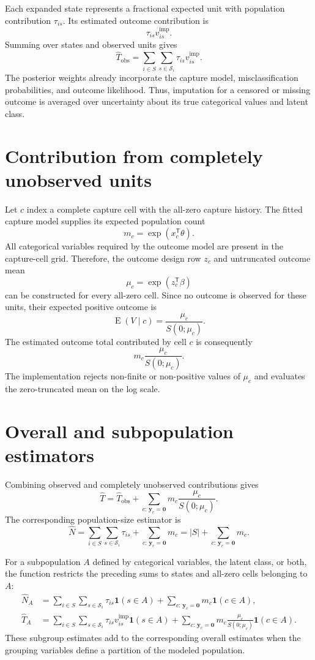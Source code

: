 \documentclass[11pt,a4paper]{article}
\begin{document}
Each expanded state represents a fractional expected unit with population
contribution $\tau_{is}$. Its estimated outcome contribution is
\[
  \tau_{is}v_{is}^{\mathrm{imp}}.
\]
Summing over states and observed units gives
\[
  \widehat T_{\mathrm{obs}}
  =\sum_{i\in S}\sum_{s\in\mathcal S_i}
    \tau_{is}v_{is}^{\mathrm{imp}}.
\]
The posterior weights already incorporate the capture model,
misclassification probabilities, and outcome likelihood. Thus, imputation for
a censored or missing outcome is averaged over uncertainty about its true
categorical values and latent class.

\section{Contribution from completely unobserved units}

Let $c$ index a complete capture cell with the all-zero capture history. The
fitted capture model supplies its expected population count
\[
  m_c=\exp(x_c^{\mathsf T}\theta).
\]
All categorical variables required by the outcome model are present in the
capture-cell grid. Therefore, the outcome design row $z_c$ and untruncated
outcome mean
\[
  \mu_c=\exp(z_c^{\mathsf T}\beta)
\]
can be constructed for every all-zero cell. Since no outcome is observed for
these units, their expected positive outcome is
\[
  \operatorname{E}(V\mid c)
  =\frac{\mu_c}{S(0;\mu_c)}.
\]
The estimated outcome total contributed by cell $c$ is consequently
\[
  m_c\frac{\mu_c}{S(0;\mu_c)}.
\]
The implementation rejects non-finite or non-positive values of $\mu_c$ and
evaluates the zero-truncated mean on the log scale.

\section{Overall and subpopulation estimators}

Combining observed and completely unobserved contributions gives
\[
  \widehat T
  =\widehat T_{\mathrm{obs}}
   +\sum_{c:\,\boldsymbol y_c=\boldsymbol 0}
      m_c\frac{\mu_c}{S(0;\mu_c)}.
\]
The corresponding population-size estimator is
\[
  \widehat N
  =\sum_{i\in S}\sum_{s\in\mathcal S_i}\tau_{is}
   +\sum_{c:\,\boldsymbol y_c=\boldsymbol 0}m_c
  =|S|+\sum_{c:\,\boldsymbol y_c=\boldsymbol 0}m_c.
\]

For a subpopulation $A$ defined by categorical variables, the latent class,
or both, the function restricts the preceding sums to states and all-zero
cells belonging to $A$:
\begin{align*}
  \widehat N_A
  &=\sum_{i\in S}\sum_{s\in\mathcal S_i}
      \tau_{is}\mathbf 1(s\in A)
    +\sum_{c:\,\boldsymbol y_c=\boldsymbol 0}
      m_c\mathbf 1(c\in A),\\
  \widehat T_A
  &=\sum_{i\in S}\sum_{s\in\mathcal S_i}
      \tau_{is}v_{is}^{\mathrm{imp}}\mathbf 1(s\in A)
    +\sum_{c:\,\boldsymbol y_c=\boldsymbol 0}
      m_c\frac{\mu_c}{S(0;\mu_c)}\mathbf 1(c\in A).
\end{align*}
These subgroup estimates add to the corresponding overall estimates when the
grouping variables define a partition of the modeled population.
\end{document}
